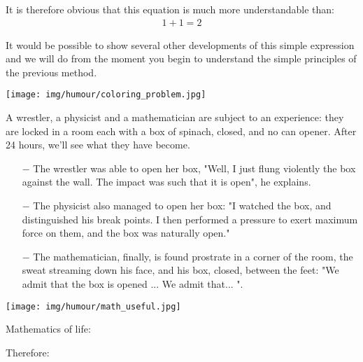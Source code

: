 	It is therefore obvious that this equation is much more understandable than:
	\begin{gather*}
	1+1=2
	\end{gather*}
	
	It would be possible to show several other developments of this simple expression and we will do from the moment you begin to understand the simple principles of the previous method.
	\begin{center}\underline{\hspace{5 cm}}\end{center}
	\begin{center}
		\texttt{[image: img/humour/coloring\_problem.jpg]}	
	\end{center}

	A wrestler, a physicist and a mathematician are subject to an experience: they are locked in a room each with a box of spinach, closed, and no can opener. After 24 hours, we'll see what they have become.
	
	\begin{itemize}	 
		\item[$-$] The wrestler was able to open her box, "Well, I just flung violently the box against the wall. The impact was such that it is open", he explains.
	
		\item[$-$] The physicist also managed to open her box: "I watched the box, and distinguished his break points. I then performed a pressure to exert maximum force on them, and the box was naturally open."
	
		\item[$-$] The mathematician, finally, is found prostrate in a corner of the room, the sweat streaming down his face, and his box, closed, between the feet: "We admit that the box is opened ... We admit that... ".
	\end{itemize}
	\begin{center}\underline{\hspace{5 cm}}\end{center}
	\begin{center}
		\texttt{[image: img/humour/math\_useful.jpg]}	
	\end{center}

	\begin{center}\underline{\hspace{5 cm}}\end{center}
	Mathematics of life:
	
	Therefore:
	

